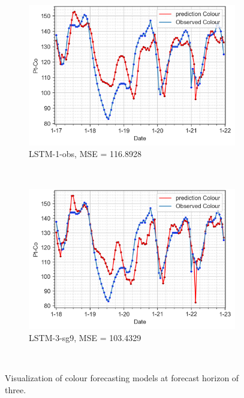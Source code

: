 \begin{figure}[!ht]
  \centering
  \begin{subfigure}[t]{0.7\textwidth}
    \includegraphics[width=\linewidth]{imgs/results/steps/colour-lstm-1-fc3.png}
    \caption{LSTM-1-obs, MSE = 116.8928} \label{fig:colour-lstm-1-fc3}
  \end{subfigure}\\
  \vspace{1em}
  \begin{subfigure}[t]{0.7\textwidth}
    \includegraphics[width=\linewidth]{imgs/results/steps/colour-lstm-3-fc3.png}
    \caption{LSTM-3-sg9, MSE = 103.4329} \label{fig:colour-lstm-3-fc3}
  \end{subfigure}\\
\caption{Visualization of colour forecasting models at forecast horizon of three.} \label{fig:colour-forecast-fc3}
\end{figure}
